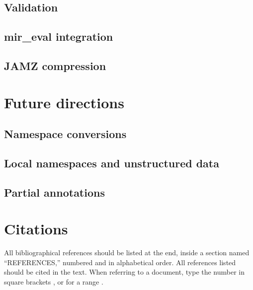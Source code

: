 \documentclass{article}
\begin{document}
\subsection{Validation}\label{sec:imp:validation}
\subsection{mir\_eval integration}\label{sec:imp:mireval}
\subsection{JAMZ compression}\label{sec:imp:compression}

\section{Future directions}\label{sec:future}

\subsection{Namespace conversions}
\subsection{Local namespaces and unstructured data}
\subsection{Partial annotations}

\section{Citations}

All bibliographical references should be listed at the end,
inside a section named ``REFERENCES,'' numbered and in alphabetical order.
All references listed should be cited in the text.
When referring to a document, type the number in square brackets
\cite{Author:00}, or for a range \cite{Author:00,Someone:10,Someone:04}.



%
%
%
%
\end{document}

